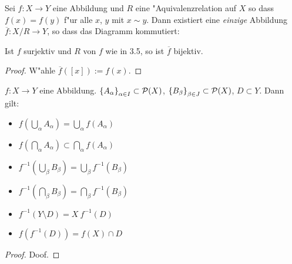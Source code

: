 \begin{lem}
    Sei $f:X \to Y$ eine Abbildung und $R$ eine "Aquivalenzrelation auf $X$ so dass
    $f(x) = f(y)$ f"ur alle $x$, $y$ mit $x \sim y$. Dann existiert eine
    \emph{einzige} Abbildung $\overline{f}: X/R \to Y$, so dass das Diagramm
    kommutiert:

    Ist $f$ surjektiv und $R$ von $f$ wie in 3.5, so ist $\overline{f}$ bijektiv.
    \begin{proof}
        W"ahle $\overline{f}([x]) := f(x)$.
    \end{proof}
\end{lem}

\begin{lem}
    $f: X \to Y$ eine Abbildung. $\mdef{A_\alpha}_{\alpha\in I} \subset
    \potmenge{X}$, $\mdef{B_\beta}_{\beta\in J} \subset \potmenge{X}$,
    $D\subset Y$. Dann gilt:
    \begin{itemize}
        \item $f\left(\bigcup_\alpha A_\alpha\right) = \bigcup_\alpha f(A_\alpha)$
        \item $f\left(\bigcap_\alpha A_\alpha\right) \subset \bigcap_\alpha
            f(A_\alpha)$
        \item $f^{-1}\left(\bigcup_\beta B_\beta\right) = \bigcup_\beta
            f^{-1}(B_\beta)$
        \item $f^{-1}\left(\bigcap_\beta B_\beta\right) = \bigcap_\beta
            f^{-1}(B_\beta)$
        \item $f^{-1}(Y \setminus D) = X \ f^{-1}(D)$
        \item $f(f^{-1}(D)) = f(X) \cap D$
    \end{itemize}
    \begin{proof}
        Doof.
    \end{proof}
\end{lem}

